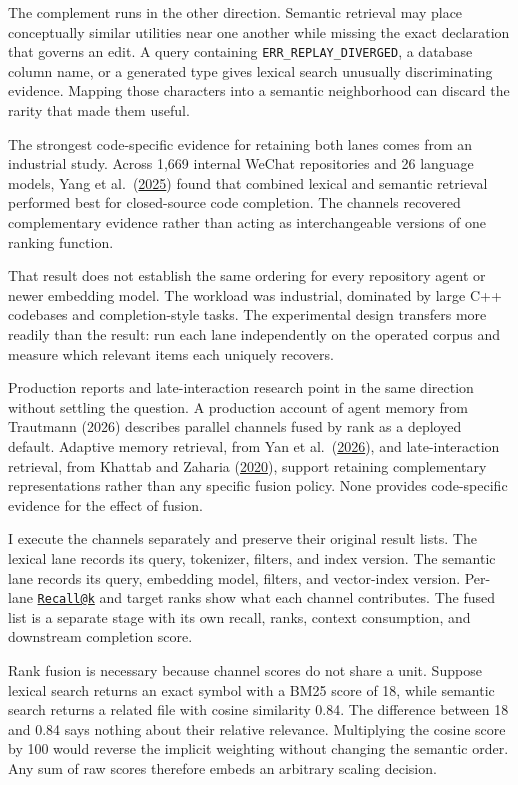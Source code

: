 The complement runs in the other direction. Semantic retrieval may place conceptually similar utilities near one another while missing the exact declaration that governs an edit. A query containing \texttt{ERR\_REPLAY\_DIVERGED}, a database column name, or a generated type gives lexical search unusually discriminating evidence. Mapping those characters into a semantic neighborhood can discard the rarity that made them useful.

The strongest code-specific evidence for retaining both lanes comes from an industrial study. Across 1,669 internal WeChat repositories and 26 language models, Yang et al.~(\href{https://arxiv.org/abs/2507.18515}{2025}) found that combined lexical and semantic retrieval performed best for closed-source code completion. The channels recovered complementary evidence rather than acting as interchangeable versions of one ranking function.

That result does not establish the same ordering for every repository agent or newer embedding model. The workload was industrial, dominated by large C++ codebases and completion-style tasks. The experimental design transfers more readily than the result: run each lane independently on the operated corpus and measure which relevant items each uniquely recovers.

Production reports and late-interaction research point in the same direction without settling the question. A production account of agent memory from Trautmann (2026) describes parallel channels fused by rank as a deployed default. Adaptive memory retrieval, from Yan et al.~(\href{https://arxiv.org/abs/2603.16496}{2026}), and late-interaction retrieval, from Khattab and Zaharia (\href{https://arxiv.org/abs/2004.12832}{2020}), support retaining complementary representations rather than any specific fusion policy. None provides code-specific evidence for the effect of fusion.

I execute the channels separately and preserve their original result lists. The lexical lane records its query, tokenizer, filters, and index version. The semantic lane records its query, embedding model, filters, and vector-index version. Per-lane \href{mailto:Recall@k}{\nolinkurl{Recall@k}} and target ranks show what each channel contributes. The fused list is a separate stage with its own recall, ranks, context consumption, and downstream completion score.

Rank fusion is necessary because channel scores do not share a unit. Suppose lexical search returns an exact symbol with a BM25 score of 18, while semantic search returns a related file with cosine similarity 0.84. The difference between 18 and 0.84 says nothing about their relative relevance. Multiplying the cosine score by 100 would reverse the implicit weighting without changing the semantic order. Any sum of raw scores therefore embeds an arbitrary scaling decision.

